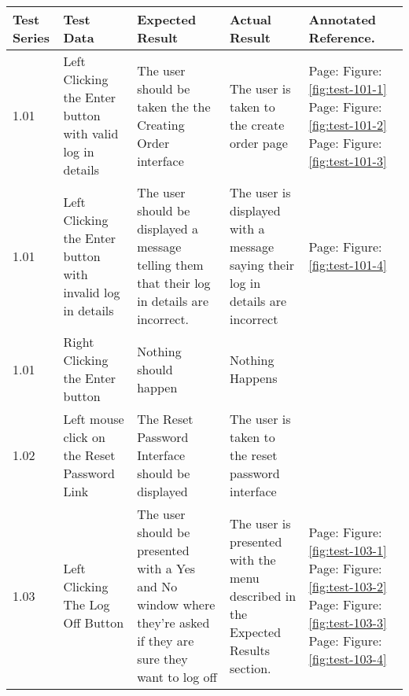 \begin{flushleft}
\label{fig:actual-results}
    \begin{longtable}{|p{1.0cm}|p{2.5cm}|p{3cm}|p{3.0cm}|p{2.5cm}|}
        \hline
        \textbf{Test Series} & \textbf{Test Data} & \textbf{Expected Result} &  \textbf{Actual Result} &  \textbf{Annotated Reference.}\\ \hline
	1.01 & Left Clicking the Enter button with valid log in details & The user should be taken the the Creating Order interface& The user is taken to the create order page  & Page:\pageref{fig:test-101-1}  \newline Figure:\ref{fig:test-101-1} \newline \newline Page:\pageref{fig:test-101-2}  \newline Figure:\ref{fig:test-101-2} \newline \newline Page:\pageref{fig:test-101-3}  \newline Figure:\ref{fig:test-101-3} \\ \hline
	1.01 & Left Clicking the Enter button with invalid log in details &The user should be displayed a message telling them that their log in details are incorrect. & The user is displayed with a message saying their log in details are incorrect & Page:\pageref{fig:test-101-4}  \newline Figure:\ref{fig:test-101-4} \\ \hline
	1.01 & Right Clicking the Enter button & Nothing should happen & Nothing Happens &\\ \hline 
	1.02 & Left mouse click on the Reset Password Link & The Reset Password Interface should be displayed & The user is taken to the reset password interface & \\ \hline
	1.03 & Left Clicking The Log Off Button & The user should be presented with a Yes and No window where they're asked if they are sure they want to log off& The user is presented with the menu described in the Expected Results section.& Page:\pageref{fig:test-103-1}  \newline Figure:\ref{fig:test-103-1} \newline \newline Page:\pageref{fig:test-103-2}  \newline Figure:\ref{fig:test-103-2} \newline \newline Page:\pageref{fig:test-103-3}  \newline Figure:\ref{fig:test-103-3} \newline \newline Page:\pageref{fig:test-103-4}  \newline Figure:\ref{fig:test-103-4}\\ \hline

\end{longtable}
\end{flushleft}
